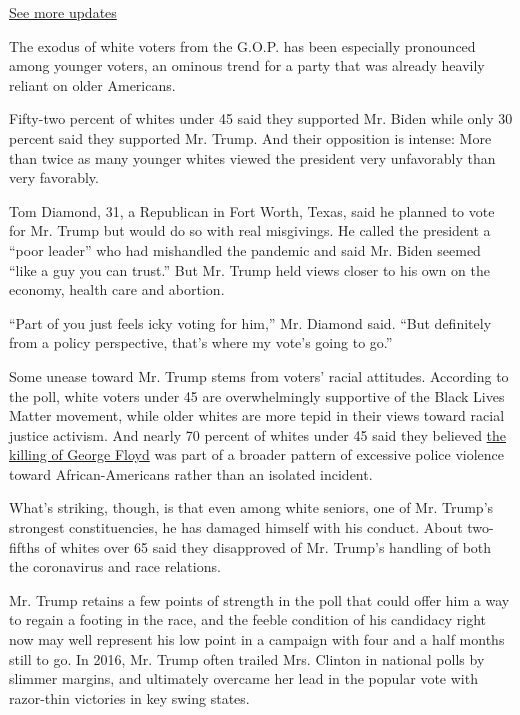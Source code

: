 \href{https://www.nytimes.com/2020/08/04/us/elections/primary-election-michigan-arizona-kansas.html?action=click\&pgtype=Article\&state=default\&region=MAIN_CONTENT_1\&context=storylines_live_updates}{See
more updates}

The exodus of white voters from the G.O.P. has been especially
pronounced among younger voters, an ominous trend for a party that was
already heavily reliant on older Americans.

Fifty-two percent of whites under 45 said they supported Mr. Biden while
only 30 percent said they supported Mr. Trump. And their opposition is
intense: More than twice as many younger whites viewed the president
very unfavorably than very favorably.

Tom Diamond, 31, a Republican in Fort Worth, Texas, said he planned to
vote for Mr. Trump but would do so with real misgivings. He called the
president a ``poor leader'' who had mishandled the pandemic and said Mr.
Biden seemed ``like a guy you can trust.'' But Mr. Trump held views
closer to his own on the economy, health care and abortion.

``Part of you just feels icky voting for him,'' Mr. Diamond said. ``But
definitely from a policy perspective, that's where my vote's going to
go.''

Some unease toward Mr. Trump stems from voters' racial attitudes.
According to the poll, white voters under 45 are overwhelmingly
supportive of the Black Lives Matter movement, while older whites are
more tepid in their views toward racial justice activism. And nearly 70
percent of whites under 45 said they believed
\href{https://www.nytimes.com/2020/05/31/us/george-floyd-investigation.html}{the
killing of George Floyd} was part of a broader pattern of excessive
police violence toward African-Americans rather than an isolated
incident.

What's striking, though, is that even among white seniors, one of Mr.
Trump's strongest constituencies, he has damaged himself with his
conduct. About two-fifths of whites over 65 said they disapproved of Mr.
Trump's handling of both the coronavirus and race relations.

Mr. Trump retains a few points of strength in the poll that could offer
him a way to regain a footing in the race, and the feeble condition of
his candidacy right now may well represent his low point in a campaign
with four and a half months still to go. In 2016, Mr. Trump often
trailed Mrs. Clinton in national polls by slimmer margins, and
ultimately overcame her lead in the popular vote with razor-thin
victories in key swing states.

